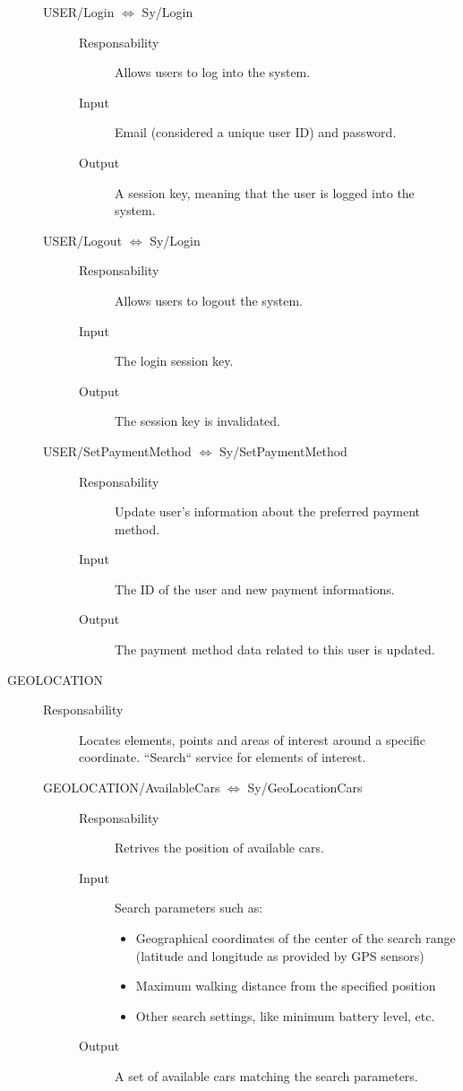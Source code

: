 \documentclass[11pt]{article} %
\begin{document}
\begin{description}
\begin{description}
	\item[USER/Login $\Leftrightarrow$ Sy/Login] \hfill
		\begin{description}
			\item[Responsability] Allows users to log into the system.
			\item[Input] Email (considered a unique user ID) and password.
			\item[Output] A session key, meaning that the user is logged into the system.
		\end{description}

	\item[USER/Logout $\Leftrightarrow$ Sy/Login] \hfill
		\begin{description}
			\item[Responsability] Allows users to logout the system.
			\item[Input] The login session key.
			\item[Output] The session key is invalidated. 
		\end{description}

	\item[USER/SetPaymentMethod $\Leftrightarrow$ Sy/SetPaymentMethod] \hfill
		\begin{description}
			\item[Responsability] Update user's information about the preferred payment method.
			\item[Input] The ID of the user and new payment informations.
			\item[Output] The payment method data related to this user is updated.
		\end{description}
	\end{description}

	\item[GEOLOCATION] \hfill
	\begin{description}
		\item[Responsability] Locates elements, points and areas of interest around a specific coordinate. ``Search`` service for elements of interest.

	\item[GEOLOCATION/AvailableCars $\Leftrightarrow$ Sy/GeoLocationCars] \hfill
		\begin{description}
			\item[Responsability] Retrives the position of available cars.
			\item[Input] Search parameters such as:
			\begin{itemize}
				\item Geographical coordinates of the center of the search range (latitude and longitude as provided by GPS sensors) 
				\item Maximum walking distance from the specified position
				\item Other search settings, like minimum battery level, etc.
			\end{itemize}
			\item[Output] A set of available cars matching the search parameters.
		\end{description}


\end{description}
\end{description}
\end{document}
